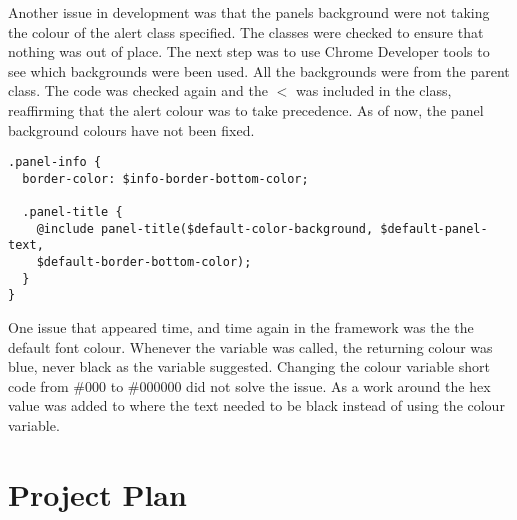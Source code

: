 Another issue in development was that the panels background were not taking the colour of the alert class specified. The classes were checked to ensure that nothing was out of place. The next step was to use Chrome Developer tools to see which backgrounds were been used. All the backgrounds were from the parent class. The code was checked again and the $<$ was included in the class, reaffirming that the alert colour was to take precedence. As of now, the panel background colours have not been fixed.

\begin{lstlisting}[language=CSS3]
.panel-info {
  border-color: $info-border-bottom-color;

  .panel-title {
    @include panel-title($default-color-background, $default-panel-text, 
    $default-border-bottom-color);
  }
}
\end{lstlisting}

One issue that appeared time, and time again in the framework was the the default font colour. Whenever the variable was called, the returning colour was blue, never black as the variable suggested. Changing the colour variable short code from \#000 to \#000000 did not solve the issue. As a work around the hex value was added to where the text needed to be black instead of using the colour variable. 

\newpage
\section*{Project Plan}
